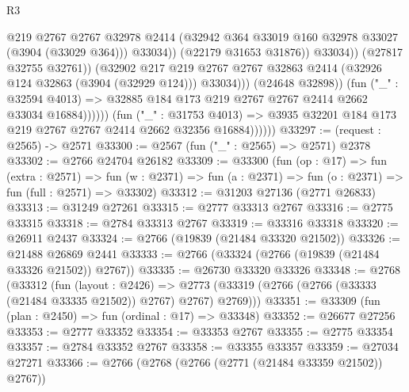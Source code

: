 \begin{lexlean}{R3}
\begin{coremodule}
                                          @219
                                          @2767
                                          @2767
                                          @32978
                                          @2414
                                          (@32942
                                            @364
                                            @33019
                                            @160
                                            @32978
                                            @33027
                                            (@3904 (@33029 @364)))
                                          @33034))
                                      (@22179 @31653 @31876))
                                    @33034))
                                (@27817 @32755 @32761))
                              (@32902
                                @217
                                @219
                                @2767
                                @2767
                                @32863
                                @2414
                                (@32926 @124 @32863 (@3904 (@32929 @124)))
                                @33034)))
                          (@24648 @32898))
                        (fun ("_" : @32594 @4013) =>
                        @32885 @184 @173 @219 @2767 @2767 @2414 @2662 @33034 @16884))))))
              (fun ("_" : @31753 @4013) =>
              @3935 @32201 @184 @173 @219 @2767 @2767 @2414 @2662 @32356 @16884))))))
@33297 := (request : @2565) -> @2571
@33300 := @2567 (fun ("_" : @2565) => @2571) @2378
@33302 := @2766 @24704 @26182
@33309 := @33300
    (fun (op : @17) =>
    fun (extra : @2571) =>
    fun (w : @2371) => fun (a : @2371) => fun (o : @2371) => fun (full : @2571) => @33302)
@33312 := @31203 @27136 (@2771 @26833)
@33313 := @31249 @27261
@33315 := @2777 @33313 @2767
@33316 := @2775 @33315
@33318 := @2784 @33313 @2767
@33319 := @33316 @33318
@33320 := @26911 @2437
@33324 := @2766 (@19839 (@21484 @33320 @21502))
@33326 := @21488 @26869 @2441
@33333 := @2766 (@33324 (@2766 (@19839 (@21484 @33326 @21502)) @2767))
@33335 := @26730 @33320 @33326
@33348 := @2768
    (@33312
      (fun (layout : @2426) =>
      @2773 (@33319 (@2766 (@2766 (@33333 (@21484 @33335 @21502)) @2767) @2767) @2769)))
@33351 := @33309 (fun (plan : @2450) => fun (ordinal : @17) => @33348)
@33352 := @26677 @27256
@33353 := @2777 @33352
@33354 := @33353 @2767
@33355 := @2775 @33354
@33357 := @2784 @33352 @2767
@33358 := @33355 @33357
@33359 := @27034 @27271
@33366 := @2766 (@2768 (@2766 (@2771 (@21484 @33359 @21502)) @2767))

\end{coremodule}
\end{lexlean}
